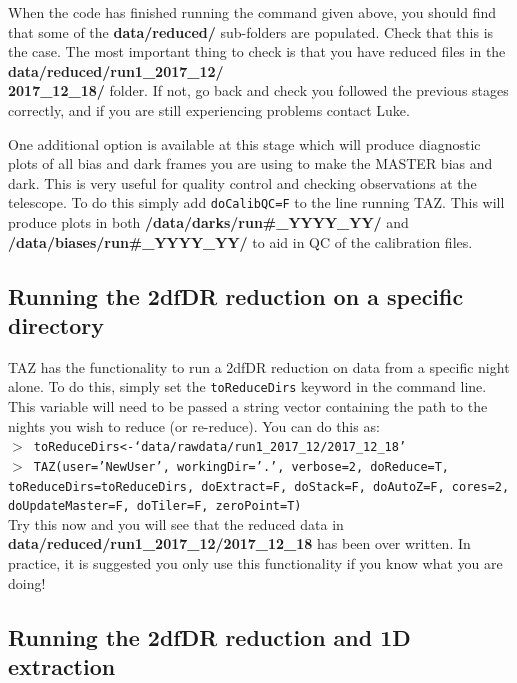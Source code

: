\documentclass[12pt]{article}
\begin{document}
When the code has finished running the command given above, you should find that some of the \textbf{data/reduced/} sub-folders are populated. Check that this is the case. The most important thing to check is that you have reduced files in the \textbf{data/reduced/run1\_2017\_12/ \\ 2017\_12\_18/} folder.  If not, go back and check you followed the previous stages correctly, and if you are still experiencing problems contact Luke.  

One additional option is available at this stage which will produce diagnostic plots of all bias and dark frames you are using to make the MASTER bias and dark. This is very useful for quality control and checking observations at the telescope. To do this simply add \texttt{doCalibQC=F} to the line running TAZ. This will produce plots in both \textbf{/data/darks/run\#\_YYYY\_YY/} and \textbf{/data/biases/run\#\_YYYY\_YY/} to aid in QC of the calibration files.

\subsection{Running the 2dfDR reduction on a specific directory}

TAZ has the functionality to run a 2dfDR reduction on data from a specific night alone. To do this, simply set the \texttt{toReduceDirs} keyword in the command line. This variable will need to be passed a string vector containing the path to the nights you wish to reduce (or re-reduce). You can do this as: \\


\hspace{10mm} \texttt{$>$ toReduceDirs<-`data/rawdata/run1\_2017\_12/2017\_12\_18'}\\
\hspace{10mm} \texttt{$>$ TAZ(user='NewUser', workingDir='.', verbose=2, doReduce=T, toReduceDirs=toReduceDirs, doExtract=F, doStack=F, doAutoZ=F, cores=2, doUpdateMaster=F, doTiler=F, zeroPoint=T)}\\

Try this now and you will see that the reduced data in \textbf{data/reduced/run1\_2017\_12/2017\_12\_18} has been over written. In practice, it is suggested you only use this functionality if you know what you are doing!
 

\subsection{Running the 2dfDR reduction and 1D extraction}
\end{document}

